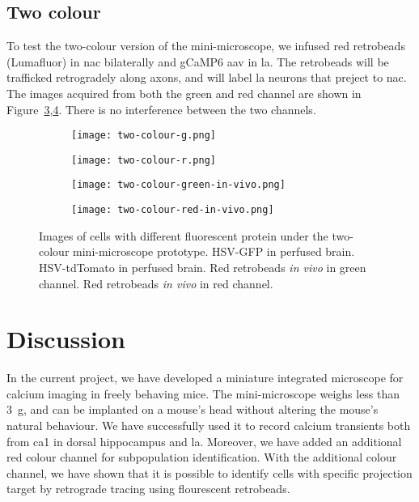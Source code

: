 \subsection{Two colour}
To test the two-colour version of the mini-microscope, we infused red retrobeads (Lumafluor) in \gls{nac} bilaterally and gCaMP6 \gls{aav} in \gls{la}. The retrobeads will be trafficked retrogradely along axons, and will label \gls{la} neurons that preject to \gls{nac}. The images acquired from both the green and red channel are shown in Figure~\ref{f.twocolour.g.invivo},\ref{f.twocolour.r.invivo}. There is no interference between the two channels.

\begin{figure}[h]
    \begin{subfigure}[t]{.5\linewidth}
        \texttt{[image: two-colour-g.png]}
        \caption{\label{f.twocolour.g}}
    \end{subfigure}
    \begin{subfigure}[t]{.5\linewidth}
        \texttt{[image: two-colour-r.png]}
        \caption{\label{f.twocolour.r}}
    \end{subfigure}
    \begin{subfigure}[t]{.5\linewidth}
        \texttt{[image: two-colour-green-in-vivo.png]}
        \caption{\label{f.twocolour.g.invivo}}
    \end{subfigure}
    \begin{subfigure}[t]{.5\linewidth}
        \texttt{[image: two-colour-red-in-vivo.png]}
        \caption{\label{f.twocolour.r.invivo}}
    \end{subfigure}

    \caption{Images of cells with different fluorescent protein under the two-colour mini-microscope prototype.  HSV-GFP in perfused brain.  HSV-tdTomato in perfused brain.  Red retrobeads \textit{in vivo} in green channel.  Red retrobeads \textit{in vivo} in red channel. \label{f.twocolour}}
\end{figure}

\section{Discussion}

In the current project, we have developed a miniature integrated microscope for calcium imaging in freely behaving mice. The mini-microscope weighs less than \SI{3}{\gram}, and can be implanted on a mouse's head without altering the mouse's natural behaviour. We have successfully used it to record calcium transients both from \gls{ca1} in dorsal hippocampus and \gls{la}. Moreover, we have added an additional red colour channel for subpopulation identification. With the additional colour channel, we have shown that it is possible to identify cells with specific projection target by retrograde tracing using flourescent retrobeads. 


